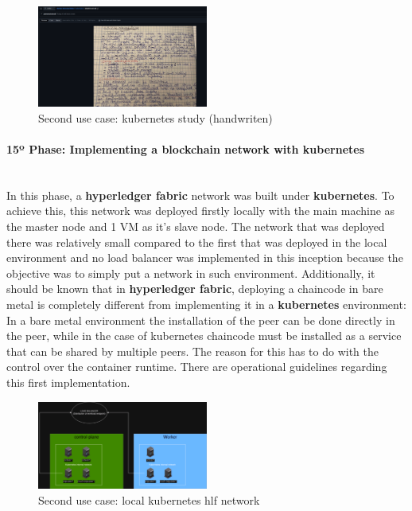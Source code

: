 \begin{figure}[H]
    \centering
    \includegraphics[width=0.5\textwidth]{assets/use-case-2/kubernetes-study2.png} %
    \caption{Second use case: kubernetes study (handwriten)}
    \label{fig:sample-image} 
\end{figure}

\paragraph{15º Phase: Implementing a blockchain network with kubernetes}\mbox{}\\
In this phase, a \textbf{hyperledger fabric} network was built under \textbf{kubernetes}. To achieve this, this network was deployed firstly locally with the main machine as the master node and 1 VM as it's slave node. The network that was deployed there was relatively small compared to the first that was deployed in the local environment and no load balancer was implemented in this inception because the objective was to simply put a network in such environment. Additionally, it should be known that in \textbf{hyperledger fabric}, deploying a chaincode in bare metal is completely different from implementing it in a \textbf{kubernetes} environment: In a bare metal environment the installation of the peer can be done directly in the peer, while in the case of kubernetes chaincode must be installed as a service that can be shared by multiple peers. The reason for this has to do with the control over the container runtime. There are operational guidelines regarding this first implementation.

\begin{figure}[H]
    \centering
    \includegraphics[width=0.5\textwidth]{assets/use-case-2/hlf-kuber-premise-network.png} %
    \caption{Second use case: local kubernetes hlf network}
    \label{fig:sample-image} 
\end{figure}

